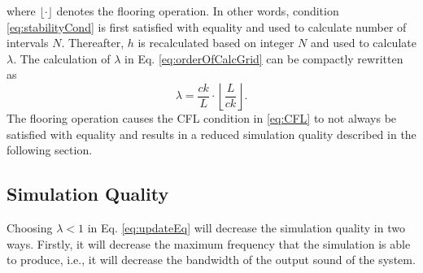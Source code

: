 where $\lfloor \cdot \rfloor$ denotes the flooring operation. In other words, condition \eqref{eq:stabilityCond} is first satisfied with equality and used to calculate number of intervals $N$. Thereafter, $h$ is recalculated based on integer $N$ and used to calculate $\lambda$. The calculation of $\lambda$ in Eq. \eqref{eq:orderOfCalcGrid} can be compactly rewritten as
\begin{equation}\label{eq:compactLambda}
    \lambda = \frac{ck}{L}\cdot\left\lfloor\frac{L}{ck}\right\rfloor.
\end{equation}
The flooring operation causes the CFL condition in \eqref{eq:CFL} to not always be satisfied with equality and results in a reduced simulation quality described in the following section.

\subsection{Simulation Quality}\label{sec:quality}
Choosing $\lambda < 1$ in Eq. \eqref{eq:updateEq} will decrease the simulation quality in two ways. Firstly, it will decrease the maximum frequency that the simulation is able to produce, i.e., it will decrease the bandwidth of the output sound of the system. 

